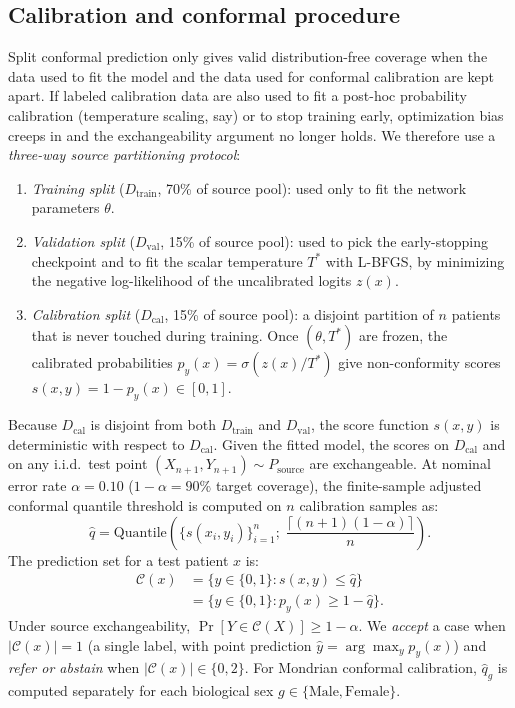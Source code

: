 \documentclass[conference]{IEEEtran}
\begin{document}
\subsection{Calibration and conformal procedure}\label{sec:conformal_theory}
Split conformal prediction only gives valid distribution-free coverage when the data used to fit the model and the data used for conformal calibration are kept apart. If labeled calibration data are also used to fit a post-hoc probability calibration (temperature scaling, say) or to stop training early, optimization bias creeps in and the exchangeability argument no longer holds. We therefore use a \emph{three-way source partitioning protocol}:
\begin{enumerate}
\item \emph{Training split} ($D_{\mathrm{train}}$, 70\% of source pool): used only to fit the network parameters $\theta$.
\item \emph{Validation split} ($D_{\mathrm{val}}$, 15\% of source pool): used to pick the early-stopping checkpoint and to fit the scalar temperature $T^*$ with L-BFGS, by minimizing the negative log-likelihood of the uncalibrated logits $z(x)$.
\item \emph{Calibration split} ($D_{\mathrm{cal}}$, 15\% of source pool): a disjoint partition of $n$ patients that is never touched during training. Once $(\theta, T^*)$ are frozen, the calibrated probabilities $p_y(x) = \sigma(z(x)/T^*)$ give non-conformity scores $s(x,y) = 1 - p_y(x) \in [0, 1]$.
\end{enumerate}
Because $D_{\mathrm{cal}}$ is disjoint from both $D_{\mathrm{train}}$ and $D_{\mathrm{val}}$, the score function $s(x,y)$ is deterministic with respect to $D_{\mathrm{cal}}$. Given the fitted model, the scores on $D_{\mathrm{cal}}$ and on any i.i.d.\ test point $(X_{n+1}, Y_{n+1}) \sim P_{\mathrm{source}}$ are exchangeable.
At nominal error rate $\alpha=0.10$ ($1-\alpha=90\%$ target coverage), the finite-sample adjusted conformal quantile threshold is computed on $n$ calibration samples as:
\begin{equation}
\hat{q} = \mathrm{Quantile}\left(\{s(x_i, y_i)\}_{i=1}^n; \; \frac{\lceil (n+1)(1-\alpha) \rceil}{n}\right).
\end{equation}
The prediction set for a test patient $x$ is:
\begin{equation}
\begin{split}
\mathcal{C}(x) &= \{y \in \{0, 1\} : s(x, y) \le \hat{q}\}\\
&= \{y \in \{0, 1\} : p_y(x) \ge 1 - \hat{q}\}.
\end{split}
\end{equation}
Under source exchangeability, $\Pr[Y \in \mathcal{C}(X)] \ge 1 - \alpha$. We \emph{accept} a case when $|\mathcal{C}(x)|=1$ (a single label, with point prediction $\hat{y} = \arg\max_y p_y(x)$) and \emph{refer or abstain} when $|\mathcal{C}(x)| \in \{0, 2\}$. For Mondrian conformal calibration, $\hat{q}_g$ is computed separately for each biological sex $g \in \{\mathrm{Male}, \mathrm{Female}\}$.
\end{document}
